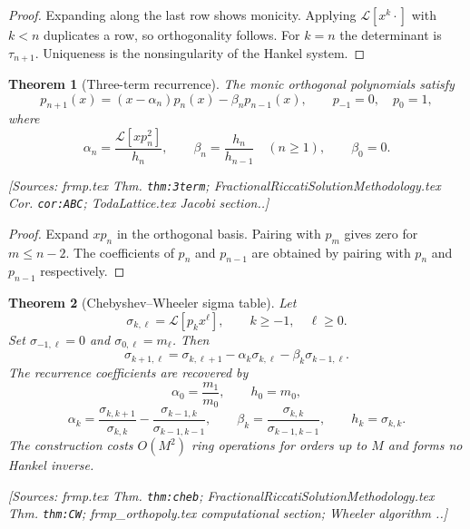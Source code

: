 \documentclass[11pt]{article}
\newtheorem{theorem}{Theorem}[section]
\theoremstyle{definition}
\newcommand{\Lc}{\mathcal{L}}
\newcommand{\Source}[1]{\par\smallskip\noindent\textup{[Sources: #1.]}}
\begin{document}
\begin{proof}
Expanding along the last row shows monicity.
Applying $\Lc[x^k\cdot]$ with $k<n$ duplicates a row,
so orthogonality follows.
For $k=n$ the determinant is $\tau_{n+1}$.
Uniqueness is the nonsingularity of the Hankel system.
\end{proof}

\begin{theorem}[Three-term recurrence]\label{thm:three-term}
The monic orthogonal polynomials satisfy
\begin{equation}\label{eq:three-term-canonical}
        p_{n+1}(x)=(x-\alpha_n)p_n(x)-\beta_np_{n-1}(x),
        \qquad p_{-1}=0,
        \quad p_0=1,
\end{equation}
where
\begin{equation}\label{eq:alpha-beta}
        \alpha_n=\frac{\Lc[xp_n^2]}{h_n},
        \qquad
        \beta_n=\frac{h_n}{h_{n-1}}\quad(n\ge1),
        \qquad
        \beta_0=0.
\end{equation}
\Source{frmp.tex Thm. \texttt{thm:3term}; FractionalRiccatiSolutionMethodology.tex Cor. \texttt{cor:ABC}; TodaLattice.tex Jacobi section.}
\end{theorem}

\begin{proof}
Expand $xp_n$ in the orthogonal basis.
Pairing with $p_m$ gives zero for $m\le n-2$.
The coefficients of $p_n$ and $p_{n-1}$ are obtained by pairing with $p_n$ and $p_{n-1}$ respectively.
\end{proof}

\begin{theorem}[Chebyshev--Wheeler sigma table]\label{thm:cheb-wheeler}
Let
\begin{equation}\label{eq:sigma-def}
        \sigma_{k,\ell}=\Lc[p_kx^\ell],
        \qquad k\ge-1,
        \quad \ell\ge0.
\end{equation}
Set $\sigma_{-1,\ell}=0$ and $\sigma_{0,\ell}=m_\ell$.
Then
\begin{equation}\label{eq:sigma-rec}
        \sigma_{k+1,\ell}=\sigma_{k,\ell+1}-\alpha_k\sigma_{k,\ell}-\beta_k\sigma_{k-1,\ell}.
\end{equation}
The recurrence coefficients are recovered by
\begin{equation}\label{eq:sigma-extract}
        \alpha_0=\frac{m_1}{m_0},
        \qquad
        h_0=m_0,
\end{equation}
\begin{equation}\label{eq:sigma-extract-k}
        \alpha_k=\frac{\sigma_{k,k+1}}{\sigma_{k,k}}
        -\frac{\sigma_{k-1,k}}{\sigma_{k-1,k-1}},
        \qquad
        \beta_k=\frac{\sigma_{k,k}}{\sigma_{k-1,k-1}},
        \qquad
        h_k=\sigma_{k,k}.
\end{equation}
The construction costs $O(M^2)$ ring operations for orders up to $M$ and forms no Hankel inverse.
\Source{frmp.tex Thm. \texttt{thm:cheb}; FractionalRiccatiSolutionMethodology.tex Thm. \texttt{thm:CW}; frmp\_orthopoly.tex computational section; Wheeler algorithm \cite{wheelerModifiedMomentsGaussianQuadratures}.}
\end{theorem}
\end{document}
